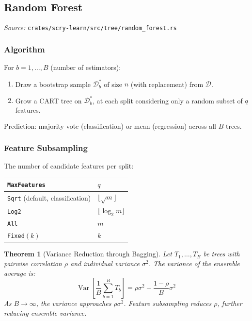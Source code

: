 \documentclass[11pt,a4paper]{article}
\newtheorem{theorem}{Theorem}[section]
\theoremstyle{definition}
\theoremstyle{remark}
\DeclareMathOperator{\Var}{Var}
\begin{document}
\subsection{Random Forest}
\label{sec:rf}

\noindent\textit{Source:} \texttt{crates/scry-learn/src/tree/random\_forest.rs}

\subsubsection*{Algorithm}

For $b = 1, \ldots, B$ (number of estimators):
\begin{enumerate}[label=\arabic*., itemsep=0pt]
\item Draw a bootstrap sample $\mathcal{D}_b^*$ of size $n$ (with replacement) from $\mathcal{D}$.
\item Grow a CART tree on $\mathcal{D}_b^*$, at each split considering only a random subset of $q$ features.
\end{enumerate}

Prediction: majority vote (classification) or mean (regression) across all $B$ trees.

\subsubsection*{Feature Subsampling}

The number of candidate features per split:
\begin{center}
\begin{tabular}{ll}
\toprule
\texttt{MaxFeatures} & $q$ \\
\midrule
\texttt{Sqrt} (default, classification) & $\lfloor\sqrt{m}\rfloor$ \\
\texttt{Log2} & $\lfloor\log_2 m\rfloor$ \\
\texttt{All} & $m$ \\
\texttt{Fixed}$(k)$ & $k$ \\
\bottomrule
\end{tabular}
\end{center}

\begin{theorem}[Variance Reduction through Bagging]
\label{thm:bag-var}
Let $T_1, \ldots, T_B$ be trees with pairwise correlation $\rho$ and individual variance $\sigma^2$. The variance of the ensemble average is:
\begin{equation}
\Var\left[\frac{1}{B}\sum_{b=1}^B T_b\right] = \rho\sigma^2 + \frac{1-\rho}{B}\sigma^2
\end{equation}
As $B \to \infty$, the variance approaches $\rho\sigma^2$. Feature subsampling reduces $\rho$, further reducing ensemble variance.
\end{theorem}
\end{document}
